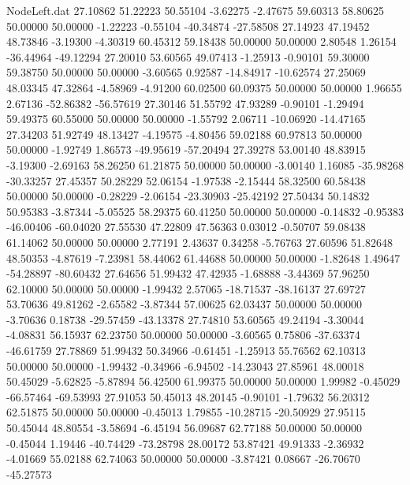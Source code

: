 \begin{filecontents}{NodeLeft.dat}
  27.10862   51.22223   50.55104    -3.62275   -2.47675   59.60313   58.80625   50.00000   50.00000   -1.22223   -0.55104  -40.34874  -27.58508
  27.14923   47.19452   48.73846    -3.19300   -4.30319   60.45312   59.18438   50.00000   50.00000    2.80548    1.26154  -36.44964  -49.12294
  27.20010   53.60565   49.07413    -1.25913   -0.90101   59.30000   59.38750   50.00000   50.00000   -3.60565    0.92587  -14.84917  -10.62574
  27.25069   48.03345   47.32864    -4.58969   -4.91200   60.02500   60.09375   50.00000   50.00000    1.96655    2.67136  -52.86382  -56.57619
  27.30146   51.55792   47.93289    -0.90101   -1.29494   59.49375   60.55000   50.00000   50.00000   -1.55792    2.06711  -10.06920  -14.47165
  27.34203   51.92749   48.13427    -4.19575   -4.80456   59.02188   60.97813   50.00000   50.00000   -1.92749    1.86573  -49.95619  -57.20494
  27.39278   53.00140   48.83915    -3.19300   -2.69163   58.26250   61.21875   50.00000   50.00000   -3.00140    1.16085  -35.98268  -30.33257
  27.45357   50.28229   52.06154    -1.97538   -2.15444   58.32500   60.58438   50.00000   50.00000   -0.28229   -2.06154  -23.30903  -25.42192
  27.50434   50.14832   50.95383    -3.87344   -5.05525   58.29375   60.41250   50.00000   50.00000   -0.14832   -0.95383  -46.00406  -60.04020
  27.55530   47.22809   47.56363     0.03012   -0.50707   59.08438   61.14062   50.00000   50.00000    2.77191    2.43637    0.34258   -5.76763
  27.60596   51.82648   48.50353    -4.87619   -7.23981   58.44062   61.44688   50.00000   50.00000   -1.82648    1.49647  -54.28897  -80.60432
  27.64656   51.99432   47.42935    -1.68888   -3.44369   57.96250   62.10000   50.00000   50.00000   -1.99432    2.57065  -18.71537  -38.16137
  27.69727   53.70636   49.81262    -2.65582   -3.87344   57.00625   62.03437   50.00000   50.00000   -3.70636    0.18738  -29.57459  -43.13378
  27.74810   53.60565   49.24194    -3.30044   -4.08831   56.15937   62.23750   50.00000   50.00000   -3.60565    0.75806  -37.63374  -46.61759
  27.78869   51.99432   50.34966    -0.61451   -1.25913   55.76562   62.10313   50.00000   50.00000   -1.99432   -0.34966   -6.94502  -14.23043
  27.85961   48.00018   50.45029    -5.62825   -5.87894   56.42500   61.99375   50.00000   50.00000    1.99982   -0.45029  -66.57464  -69.53993
  27.91053   50.45013   48.20145    -0.90101   -1.79632   56.20312   62.51875   50.00000   50.00000   -0.45013    1.79855  -10.28715  -20.50929
  27.95115   50.45044   48.80554    -3.58694   -6.45194   56.09687   62.77188   50.00000   50.00000   -0.45044    1.19446  -40.74429  -73.28798
  28.00172   53.87421   49.91333    -2.36932   -4.01669   55.02188   62.74063   50.00000   50.00000   -3.87421    0.08667  -26.70670  -45.27573

\end{filecontents}

